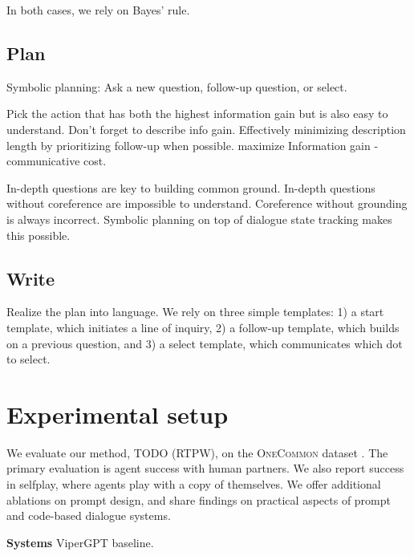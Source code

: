 \documentclass[11pt]{article}
\newcommand{\system}{RTPW}
\begin{document}
In both cases, we rely on Bayes' rule.

\subsection{Plan}
\label{sec:plan}
Symbolic planning: Ask a new question, follow-up question, or select.

Pick the action that has both the highest information gain
but is also easy to understand.
Don't forget to describe info gain.
Effectively minimizing description length by prioritizing follow-up when possible.
maximize Information gain - communicative cost.

In-depth questions are key to building common ground.
In-depth questions without coreference are impossible to understand.
Coreference without grounding is always incorrect.
Symbolic planning on top of dialogue state tracking makes this possible.

\subsection{Write}
\label{sec:write}
Realize the plan into language.
We rely on three simple templates:
1) a start template, which initiates a line of inquiry,
2) a follow-up template, which builds on a previous question,
and 3) a select template, which communicates which dot to select.

\section{Experimental setup}
\label{sec:exp}
We evaluate our method, TODO (\system{}),
on the \textsc{OneCommon} dataset \citep{onecommon}.
The primary evaluation is agent success with human partners.
We also report success in selfplay, where agents play with a copy of 
themselves.
We offer additional ablations on prompt design,
and share findings on practical aspects of prompt and code-based
dialogue systems.


\textbf{Systems}
ViperGPT baseline.
\end{document}
